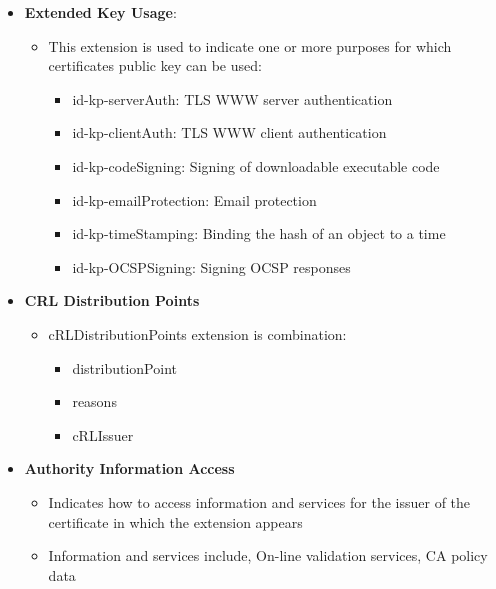 \documentclass[a4paper]{article}
\begin{document}
\begin{itemize}
\begin{itemize}
                \end{itemize}
            \item \textbf{Extended Key Usage}:
                \begin{itemize}
                    \item This extension is used to indicate one or more purposes for which certificates public key can be used:
                        \begin{itemize}
                            \item id-kp-serverAuth: TLS WWW server authentication
                            \item id-kp-clientAuth: TLS WWW client authentication
                            \item id-kp-codeSigning: Signing of downloadable executable code
                            \item id-kp-emailProtection: Email protection
                            \item id-kp-timeStamping: Binding the hash of an object to a time
                            \item id-kp-OCSPSigning: Signing OCSP responses
                        \end{itemize}
                \end{itemize}
            \item \textbf{CRL Distribution Points}
                \begin{itemize}
                    \item cRLDistributionPoints extension is combination:
                        \begin{itemize}
                            \item distributionPoint
                            \item reasons
                            \item cRLIssuer
                        \end{itemize}
                \end{itemize}
            \item \textbf{Authority Information Access}
                \begin{itemize}
                    \item Indicates how to access information and services for the issuer of the certificate in which the extension appears
                    \item Information and services include, On-line validation services, CA policy data

\end{itemize}
\end{itemize}
\end{document}
